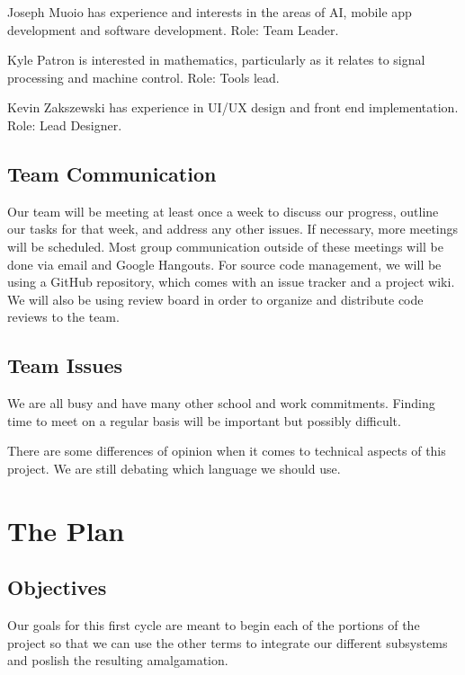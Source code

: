 \documentclass{report}
\begin{document}
Joseph Muoio has experience and interests in the areas of AI, mobile app
development and software development. Role: Team Leader.

Kyle Patron is interested in mathematics, particularly as it relates to
signal processing and machine control. Role: Tools lead.

Kevin Zakszewski has experience in UI/UX design and front end
implementation. Role: Lead Designer.

\subsection*{Team Communication}

Our team will be meeting at least once a week to discuss our progress,
outline our tasks for that week, and address any other issues. If necessary,
more meetings will be scheduled. Most group communication outside of these
meetings will be done via email and Google Hangouts. For source code
management, we will be using a GitHub repository, which comes with an issue
tracker and a project wiki. We will also be using review board in order to
organize and distribute code reviews to the team. 

\subsection*{Team Issues}

We are all busy and have many other school and work commitments. Finding
time to meet on a regular basis will be important but possibly difficult.

There are some differences of opinion when it comes to technical aspects of
this project. We are still debating which language we should use.

\newpage
\section*{\centering The Plan}

\subsection*{Objectives}

Our goals for this first cycle are meant to begin each of the portions of
the project so that we can use the other terms to integrate our different
subsystems and poslish the resulting amalgamation.
\end{document}
